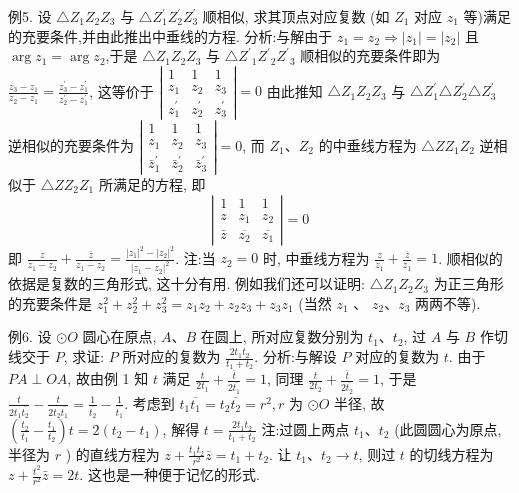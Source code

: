 例5. 设 $\triangle Z_1 Z_2 Z_3$ 与 $\triangle Z_1^{\prime} Z_2^{\prime} Z_3^{\prime}$ 顺相似, 求其顶点对应复数 (如 $Z_1$ 对应 $z_1$ 等)满足的充要条件,并由此推出中垂线的方程.
分析:与解由于 $z_1=z_2 \Rightarrow\left|z_1\right|=\left|z_2\right|$ 且 $\arg z_1=\arg z_2$,于是 $\triangle Z_1 Z_2 Z_3$ 与 $\triangle Z^{\prime}{ }_1 Z^{\prime}{ }_2 Z^{\prime}{ }_3$ 顺相似的充要条件即为 $\frac{z_3-z_1}{z_2-z_1}=\frac{z_3^{\prime}-z_1^{\prime}}{z_2^{\prime}-z_1^{\prime}}$, 这等价于 $\left|\begin{array}{ccc}1 & 1 & 1 \\ z_1 & z_2 & z_3 \\ z_1^{\prime} & z_2^{\prime} & z_3^{\prime}\end{array}\right|=0$
由此推知 $\triangle Z_1 Z_2 Z_3$ 与 $\triangle Z_1^{\prime} \triangle Z_2^{\prime} \triangle Z_3^{\prime}$ 逆相似的充要条件为 $\left|\begin{array}{ccc}1 & 1 & 1 \\ z_1 & z_2 & z_3 \\ \bar{z}_1^{\prime} & \bar{z}_2^{\prime} & \bar{z}_3^{\prime}\end{array}\right|=0$, 而 $Z_1 、 Z_2$ 的中垂线方程为 $\triangle Z Z_1 Z_2$ 逆相似于 $\triangle Z Z_2 Z_1$ 所满足的方程, 即
$$
\left|\begin{array}{ccc}
1 & 1 & 1 \\
z & z_1 & z_2 \\
\bar{z} & \overline{z_2} & \overline{z_1}
\end{array}\right|=0
$$
即 $\frac{z}{z_1-z_2}+\frac{\bar{z}}{z_1-z_2}=\frac{\left|z_1\right|^2-\left|z_2\right|^2}{\left|z_1-z_2\right|^2}$.
注:当 $z_2=0$ 时, 中垂线方程为 $\frac{z}{z_1}+\frac{\bar{z}}{z_1}=1$.
顺相似的依据是复数的三角形式, 这十分有用.
例如我们还可以证明: $\triangle Z_1 Z_2 Z_3$ 为正三角形的充要条件是 $z_1^2+z_2^2+z_3^2=z_1 z_2+z_2 z_3+z_3 z_1$ (当然 $z_1$ 、 $z_2 、 z_3$ 两两不等).



例6. 设 $\odot O$ 圆心在原点, $A 、 B$ 在圆上, 所对应复数分别为 $t_1 、 t_2$, 过 $A$ 与 $B$ 作切线交于 $P$, 求证: $P$ 所对应的复数为 $\frac{2 t_1 t_2}{t_1+t_2}$.
分析:与解设 $P$ 对应的复数为 $t$. 由于 $P A \perp O A$, 故由例 1 知 $t$ 满足 $\frac{t}{2 t_1}+ \frac{\bar{t}}{2 \overline{t_1}}=1$, 同理 $\frac{t}{2 t_2}+\frac{\bar{t}}{2 \overline{t_2}}=1$, 于是 $\frac{t}{2 t_1 \overline{t_2}}-\frac{t}{2 t_2 \overline{t_1}}=\frac{1}{\overline{t_2}}-\frac{1}{\overline{t_1}}$.
考虑到 $t_1 \overline{t_1}=t_2 \overline{t_2}=r^2, r$ 为 $\odot O$ 半径, 故 $\left(\frac{t_2}{t_1}-\frac{t_1}{t_2}\right) t=2\left(t_2-t_1\right)$, 解得 $t=\frac{2 t_1 t_2}{t_1+t_2}$
注:过圆上两点 $t_1 、 t_2$ (此圆圆心为原点, 半径为 $r$ ) 的直线方程为 $z+\frac{t_1 t_2}{r^2} \bar{z}=t_1+t_2$. 让 $t_1 、 t_2 \rightarrow t$, 则过 $t$ 的切线方程为 $z+\frac{t^2}{r^2} \bar{z}=2 t$. 这也是一种便于记忆的形式.



